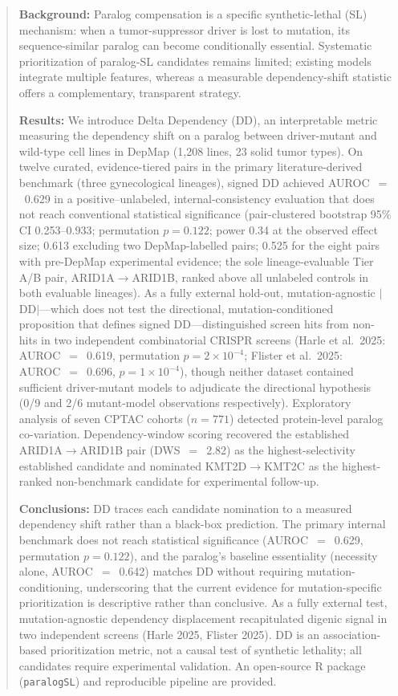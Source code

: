 \documentclass[11pt,a4paper]{article}
\begin{document}
\begin{abstract}
\textbf{Background:} Paralog compensation is a specific synthetic-lethal (SL) mechanism: when a tumor-suppressor driver is lost to mutation, its sequence-similar paralog can become conditionally essential. Systematic prioritization of paralog-SL candidates remains limited; existing models integrate multiple features, whereas a measurable dependency-shift statistic offers a complementary, transparent strategy.

\textbf{Results:} We introduce Delta Dependency (DD), an interpretable metric measuring the dependency shift on a paralog between driver-mutant and wild-type cell lines in DepMap (1,208 lines, 23 solid tumor types). On twelve curated, evidence-tiered pairs in the primary literature-derived benchmark (three gynecological lineages), signed DD achieved AUROC~$=$~0.629 in a positive--unlabeled, internal-consistency evaluation that does not reach conventional statistical significance (pair-clustered bootstrap 95\% CI 0.253--0.933; permutation $p=0.122$; power 0.34 at the observed effect size; 0.613 excluding two DepMap-labelled pairs; 0.525 for the eight pairs with pre-DepMap experimental evidence; the sole lineage-evaluable Tier A/B pair, ARID1A$\rightarrow$ARID1B, ranked above all unlabeled controls in both evaluable lineages). As a fully external hold-out, mutation-agnostic $|$DD$|$—which does not test the directional, mutation-conditioned proposition that defines signed DD—distinguished screen hits from non-hits in two independent combinatorial CRISPR screens (Harle et al.\ 2025: AUROC~$=$~0.619, permutation $p=2\times10^{-4}$; Flister et al.\ 2025: AUROC~$=$~0.696, $p=1\times10^{-4}$), though neither dataset contained sufficient driver-mutant models to adjudicate the directional hypothesis (0/9 and 2/6 mutant-model observations respectively). Exploratory analysis of seven CPTAC cohorts ($n=771$) detected protein-level paralog co-variation. Dependency-window scoring recovered the established ARID1A$\rightarrow$ARID1B pair (DWS~$=$~2.82) as the highest-selectivity established candidate and nominated KMT2D$\rightarrow$KMT2C as the highest-ranked non-benchmark candidate for experimental follow-up.

\textbf{Conclusions:} DD traces each candidate nomination to a measured dependency shift rather than a black-box prediction. The primary internal benchmark does not reach statistical significance (AUROC~$=$~0.629, permutation $p=0.122$), and the paralog's baseline essentiality (necessity alone, AUROC~$=$~0.642) matches DD without requiring mutation-conditioning, underscoring that the current evidence for mutation-specific prioritization is descriptive rather than conclusive. As a fully external test, mutation-agnostic dependency displacement recapitulated digenic signal in two independent screens (Harle 2025, Flister 2025). DD is an association-based prioritization metric, not a causal test of synthetic lethality; all candidates require experimental validation. An open-source R package (\texttt{paralogSL}) and reproducible pipeline are provided.


\end{abstract}
\end{document}
